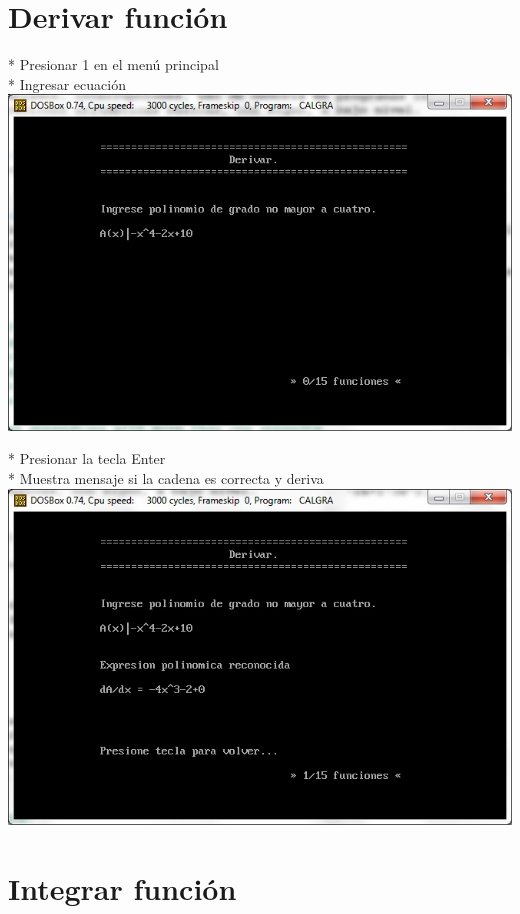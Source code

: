 \documentclass[journal]{../../IEEEtran/IEEEtran}
\begin{document}
\section{Derivar función}

* Presionar 1 en el menú principal\\

* Ingresar ecuación\\
\includegraphics[scale=0.42]{img/11.jpg}

* Presionar la tecla Enter\\

* Muestra mensaje si la cadena es correcta y deriva\\
\includegraphics[scale=0.42]{img/12.jpg}

\section{Integrar función}
\end{document}
